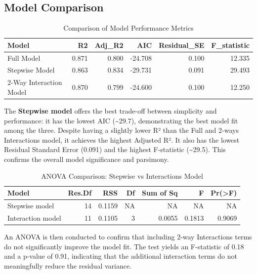 \documentclass[
  11pt,
]{article}
\begin{document}
\subsection{Model Comparison}\label{model-comparison}

\begingroup\fontsize{8}{10}\selectfont

\begin{longtable}[t]{lrrrrr}
\caption{\label{tab:unnamed-chunk-11}Comparison of Model Performance Metrics}\\
\toprule
Model & R2 & Adj\_R2 & AIC & Residual\_SE & F\_statistic\\
\midrule
Full Model & 0.871 & 0.800 & -24.708 & 0.100 & 12.335\\
Stepwise Model & 0.863 & 0.834 & -29.731 & 0.091 & 29.493\\
2-Way Interaction Model & 0.870 & 0.799 & -24.600 & 0.100 & 12.250\\
\bottomrule
\end{longtable}
\endgroup{}

The \textbf{Stepwise model} offers the best trade-off between simplicity
and performance: it has the lowest AIC (\textasciitilde29.7),
demonstrating the best model fit among the three. Despite having a
slightly lower R² than the Full and 2-ways Interactions model, it
achieves the highest Adjusted R². It also has the lowest Residual
Standard Error (0.091) and the highest F-statistic
(\textasciitilde29.5). This confirms the overall model significance and
parsimony.

\begin{table}[!h]
\centering
\caption{\label{tab:unnamed-chunk-12}ANOVA Comparison: Stepwise vs Interactions Model}
\centering
\fontsize{8}{10}\selectfont
\begin{tabular}[t]{lrrrrrr}
\toprule
Model & Res.Df & RSS & Df & Sum of Sq & F & Pr(>F)\\
\midrule
Stepwise model & 14 & 0.1159 & NA & NA & NA & NA\\
Interaction model & 11 & 0.1105 & 3 & 0.0055 & 0.1813 & 0.9069\\
\bottomrule
\end{tabular}
\end{table}

An ANOVA is then conducted to confirm that including 2-way Interactions
terms do not significantly improve the model fit. The test yields an
F-statistic of 0.18 and a p-value of 0.91, indicating that the
additional interaction terms do not meaningfully reduce the residual
variance.
\end{document}

